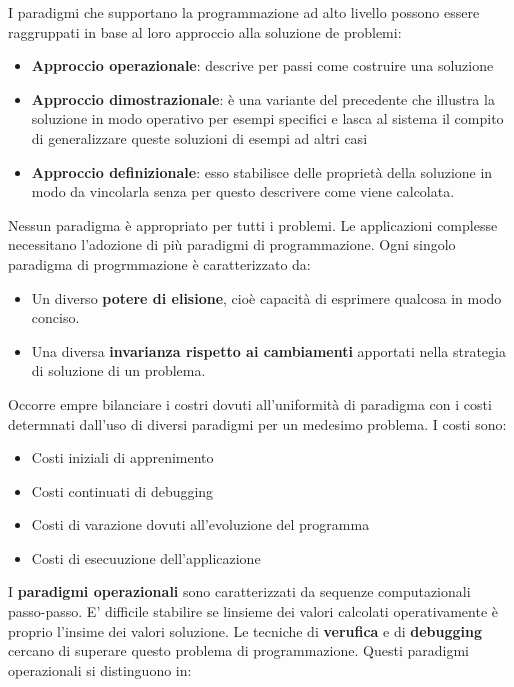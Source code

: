 \documentclass[a4paper,18pt]{extarticle}
\begin{document}
I paradigmi che supportano la programmazione ad alto livello possono essere raggruppati in base al loro approccio alla soluzione de problemi:
\begin{itemize}
  \item \textbf{Approccio operazionale}: descrive per passi come costruire una soluzione
  \item \textbf{Approccio dimostrazionale}: è una variante del precedente che illustra la soluzione in modo operativo per esempi specifici e lasca al sistema il compito di generalizzare queste soluzioni di esempi ad altri casi
  \item\textbf{Approccio definizionale}: esso stabilisce delle proprietà della soluzione in modo da vincolarla senza per questo descrivere come viene calcolata.
\end{itemize}

Nessun paradigma è appropriato per tutti i problemi. Le applicazioni complesse necessitano l'adozione di più paradigmi di programmazione. Ogni singolo paradigma di progrmmazione è caratterizzato da:
\begin{itemize}
  \item Un diverso \textbf{potere di elisione}, cioè capacità di esprimere qualcosa in modo conciso. 
  \item Una diversa \textbf{invarianza rispetto ai cambiamenti} apportati nella strategia di soluzione di un problema. 
\end{itemize}

Occorre empre bilanciare i costri dovuti all'uniformità di paradigma con i costi determnati dall'uso di diversi paradigmi per un medesimo problema. I costi sono:
\begin{itemize}
  \item Costi iniziali di apprenimento
  \item Costi continuati di debugging
  \item Costi di varazione dovuti all'evoluzione del programma
  \item Costi di esecuuzione dell'applicazione
\end{itemize}

I \textbf{paradigmi operazionali} sono caratterizzati da sequenze computazionali passo-passo. E' difficile stabilire se linsieme dei valori calcolati operativamente è proprio l'insime dei valori soluzione. Le tecniche di \textbf{verufica} e di \textbf{debugging} cercano di superare questo problema di programmazione. Questi paradigmi operazionali si distinguono in:
\end{document}

